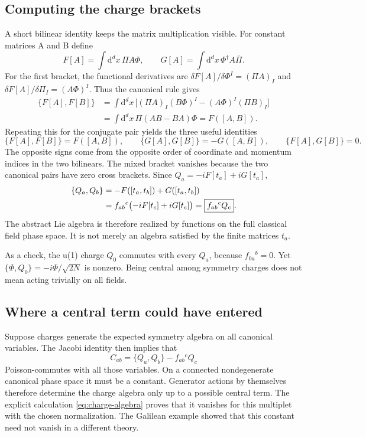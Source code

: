 \documentclass[11pt]{article}
\newcommand{\dd}{\mathrm{d}}
\begin{document}
\subsection{Computing the charge brackets}
A short bilinear identity keeps the matrix multiplication visible. For
constant matrices A and B define
\[
 F[A]=\int\dd^dx\,\Pi A\Phi,\qquad
 G[A]=\int\dd^dx\,\Phi^\dagger A\overline\Pi.
\]
For the first bracket, the functional derivatives are
\(\delta F[A]/\delta\Phi^I=(\Pi A)_I\) and
\(\delta F[A]/\delta\Pi_I=(A\Phi)^I\). Thus the canonical rule gives
\begin{align*}
 \{F[A],F[B]\}
 &=\int\dd^dx\,\bigl[(\Pi A)_I(B\Phi)^I
                      -(A\Phi)^I(\Pi B)_I\bigr]\\
 &=\int\dd^dx\,\Pi(AB-BA)\Phi=F([A,B]).
\end{align*}
Repeating this for the conjugate pair yields the three useful identities
\begin{equation}
 \{F[A],F[B]\}=F([A,B]),\qquad
 \{G[A],G[B]\}=-G([A,B]),\qquad
 \{F[A],G[B]\}=0.
 \label{eq:bilinear-brackets}
\end{equation}
The opposite signs come from the opposite order of coordinate and
momentum indices in the two bilinears. The mixed bracket vanishes
because the two canonical pairs have zero cross brackets.
Since \(Q_a=-iF[t_a]+iG[t_a]\),
\begin{align}
 \{Q_a,Q_b\}
 &=-F([t_a,t_b])+G([t_a,t_b])\notag\\
 &=f_{ab}{}^c\bigl(-iF[t_c]+iG[t_c]\bigr)
 =\boxed{f_{ab}{}^cQ_c}.
 \label{eq:charge-algebra}
\end{align}
The abstract Lie algebra is therefore realized by functions on the full
classical field phase space. It is not merely an algebra satisfied by the
finite matrices \(t_a\).

As a check, the u(1) charge \(Q_0\) commutes with every \(Q_a\), because
\(f_{0a}{}^b=0\). Yet \(\{\Phi,Q_0\}=-i\Phi/\sqrt{2N}\) is nonzero.
Being central among symmetry charges does not mean acting trivially on
all fields.

\subsection{Where a central term could have entered}
Suppose charges generate the expected symmetry algebra on all canonical
variables. The Jacobi identity then implies that
\[
 C_{ab}=\{Q_a,Q_b\}-f_{ab}{}^cQ_c
\]
Poisson-commutes with all those variables. On a connected nondegenerate
canonical phase space it must be a constant. Generator actions by
themselves therefore determine the charge algebra only up to a possible
central term. The explicit calculation \eqref{eq:charge-algebra} proves
that it vanishes for this multiplet with the chosen normalization.
The Galilean example showed that this constant need not vanish in a
different theory.
\end{document}
